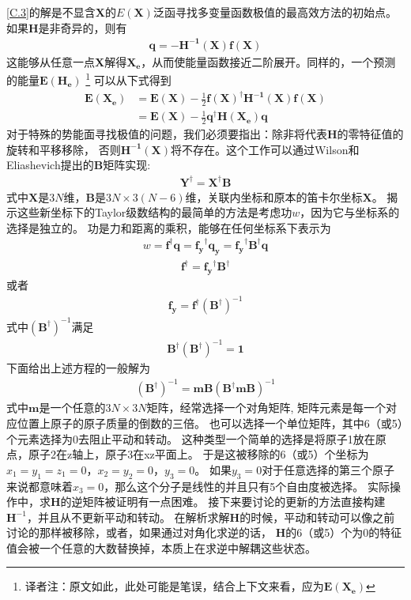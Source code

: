 \autoref{C.3}的解是不显含$\mathbf{X}$的$E(\mathbf{X})$泛函寻找多变量函数极值的最高效方法的初始点。
如果$\mathbf{H}$是非奇异的，则有
\begin{align}
	\label{C.4}
	\mathbf{q}=-\mathbf{H^{-1}(X)}\mathbf{f(X)}
\end{align}
这能够从任意一点$\mathbf{X}$解得$\mathbf{X_e}$，从而使能量函数接近二阶展开。同样的，一个预测的能量$\mathbf{E(H_e)}$
\footnote{译者注：原文如此，此处可能是笔误，结合上下文来看，应为$\mathbf{E(X_e)}$}
可以从下式得到
\begin{align}
	\label{C.5}
	\mathbf{E(X_e)}&=\mathbf{E(X)}-\frac{1}{2}\mathbf{f(X)}^{\dagger}\mathbf{H^{-1}(X)}\mathbf{f(X)}
	\nonumber\\
	&=\mathbf{E(X)}-\frac{1}{2}\mathbf{q}^{\dagger}\mathbf{H(X_e)}\mathbf{q}
\end{align}
对于特殊的势能面寻找极值的问题，我们必须要指出：除非将代表$\mathbf{H}$的零特征值的旋转和平移移除，
否则$\mathbf{H^{-1}(X)}$将不存在。这个工作可以通过Wilson和Eliashevich提出的$\mathbf{B}$矩阵实现:
\begin{align}
	\label{C.6}
	\mathbf{Y}^{\dagger}=\mathbf{X}^{\dagger}\mathbf{B}
\end{align}
式中$\mathbf{X}$是$3N$维，$\mathbf{B}$是$3N\times 3(N-6)$维，关联内坐标和原本的笛卡尔坐标$\mathbf{X}$。
揭示这些新坐标下的Taylor级数结构的最简单的方法是考虑功$w$，因为它与坐标系的选择是独立的。
功是力和距离的乘积，能够在任何坐标系下表示为
\begin{align}
	\nonumber
	w=\mathbf{f}^{\dagger}\mathbf{q}=\mathbf{f_y}^{\dagger}\mathbf{q_y}=\mathbf{f_y}^{\dagger}\mathbf{B}^{\dagger}\mathbf{q}
\end{align}
\begin{align}
	\nonumber
	\mathbf{f}^{\dagger}=\mathbf{f_y}^{\dagger}\mathbf{B}^{\dagger}
\end{align}
或者
\begin{align}
	\label{C.7}
	\mathbf{f_y}=\mathbf{f}^{\dagger}(\mathbf{B}^{\dagger})^{-1}
\end{align}
式中$(\mathbf{B}^{\dagger})^{-1}$满足
\begin{align}
	\nonumber
	\mathbf{B}^{\dagger}(\mathbf{B}^{\dagger})^{-1}=\mathbf{1}
\end{align}
下面给出上述方程的一般解为
\begin{align}
	\nonumber
	(\mathbf{B}^{\dagger})^{-1}=\mathbf{mB}(\mathbf{B^{\dagger}mB})^{-1}
\end{align}
式中$\mathbf{m}$是一个任意的$3N\times 3N$矩阵，经常选择一个对角矩阵,
矩阵元素是每一个对应位置上原子的原子质量的倒数的三倍。
也可以选择一个单位矩阵，其中6（或5）个元素选择为0去阻止平动和转动。
这种类型一个简单的选择是将原子1放在原点，原子2在z轴上，原子3在xz平面上。
于是这被移除的6（或5）个坐标为$x_1=y_1=z_1=0$，$x_2=y_2=0$，$y_3=0$。
如果$y_3=0$对于任意选择的第三个原子来说都意味着$x_3=0$，那么这个分子是线性的并且只有5个自由度被选择。
实际操作中，求$\mathbf{H}$的逆矩阵被证明有一点困难。
接下来要讨论的更新的方法直接构建$\mathbf{H}^{-1}$，并且从不更新平动和转动。
在解析求解$\mathbf{H}$的时候，平动和转动可以像之前讨论的那样被移除，或者，如果通过对角化求逆的话，
$\mathbf{H}$的6（或5）个为0的特征值会被一个任意的大数替换掉，本质上在求逆中解耦这些状态。
